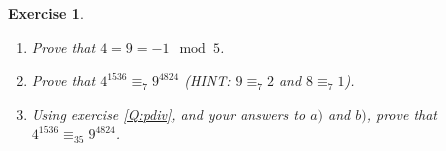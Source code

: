 \documentclass{article}
\theoremstyle{plain}
\newtheorem{Q}{Exercise}{\bfseries}{\upshape}
\begin{document}
\begin{Q}\mbox{}
\begin{enumerate}
\item[a)] Prove that $4 = 9 = -1 \mod 5$. 
\item[b)] Prove that $4^{1536}\equiv_7 9^{4824}$ (HINT: $9\equiv_7 2$ and $8\equiv_7 1$).
\item[c)] Using exercise \ref{Q:pdiv}, and your answers to $a)$ and $b)$, prove that $4^{1536}\equiv_{35} 9^{4824}$.
\end{enumerate}
\end{Q}
\begin{comment}
\textbf{Solution:}\mbox{}
\begin{enumerate}[a)]
\item $4 - (-1) = 5$, and $9 - (-1) = 2(5)$.
\item First, we have 
\begin{align*}
4^{1536} &= 2^{2(1536)} \\
&= 2^{3072} \\
&= 2^{3(1024)} \\
&= 8^{1024}\\
&\equiv_7 1^{1024}\\
&\equiv_7 1. 
\end{align*}
Second, we have 
\begin{align*}
9^{4824} & \equiv_7 2^{4824} \\
&= 2^{3(1608)} \\
&=8^{1608} \\
&\equiv_7 1^{1608} \\
& \equiv_7 1.
\end{align*}
This proves the claim.
\item It follows from part a) that 
\[4^{1536}\equiv_5 (-1)^{1536} \equiv_5 1,\] and also 
\[9^{4824} \equiv_5 (-1)^{4824} \equiv_5 1.\] This means \[4^{1536}\equiv_5 9^{4824},\] and so \[5|(4^{1536}- 9^{4824}).\] In part b) we proved that 
\[4^{1536}\equiv_7 9^{4824},\] and so \[7|(4^{1536}- 9^{4824}).\] By exercise \ref{Q:pdiv} this means \[35|(4^{1536}- 9^{4824}),\] which is another way of saying that \[4^{1536}\equiv_{35} 9^{4824}.\]
\end{enumerate}
\end{comment}
\end{document}
